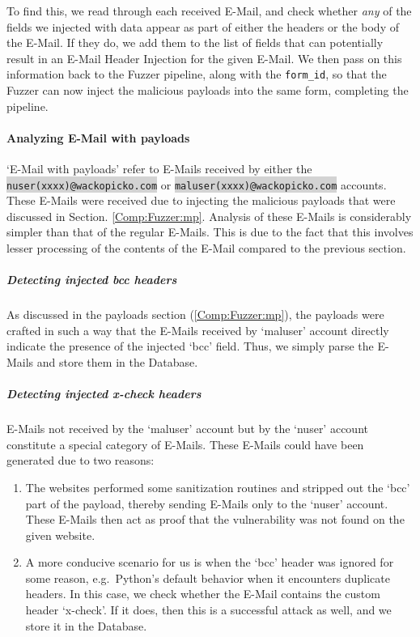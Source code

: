 To find this, we read through each received E-Mail, and check whether \emph{any} of the fields we injected with data appear as part of either the headers or the body of the E-Mail. If they do, we add them to the list of fields that can potentially result in an E-Mail Header Injection for the given E-Mail. We then pass on this information back to the Fuzzer pipeline, along with the \lstinline{form_id}, so that the Fuzzer can now inject the malicious payloads into the same form, completing the pipeline.

\paragraph{Analyzing E-Mail with payloads}
`E-Mail with payloads' refer to E-Mails received by either the \colorbox{lightgray}{\lstinline{nuser(xxxx)@wackopicko.com}} or \colorbox{lightgray}{\lstinline{maluser(xxxx)@wackopicko.com}} accounts. These E-Mails were received due to injecting the malicious payloads that were discussed in Section. \ref{Comp:Fuzzer:mp}. Analysis of these E-Mails is considerably simpler than that of the regular E-Mails. This is due to the fact that this involves lesser processing of the contents of the E-Mail compared to the previous section.
\subparagraph{Detecting injected bcc headers}
As discussed in the payloads section (\ref{Comp:Fuzzer:mp}), the payloads were crafted in such a way that the E-Mails received by `maluser' account directly indicate the presence of the injected `bcc' field. Thus, we simply parse the E-Mails and store them in the Database.

\subparagraph{Detecting injected x-check headers}
E-Mails not received by the `maluser' account but by the `nuser' account constitute a special category of E-Mails.
These E-Mails could have been generated due to two reasons:
\begin{enumerate}
	\item The websites performed some sanitization routines and stripped out the `bcc' part of the payload, thereby sending E-Mails only to the `nuser' account. These E-Mails then act as proof that the vulnerability was not found on the given website.
	\item A more conducive scenario for us is when the `bcc' header was ignored for some reason, e.g.\ Python's default behavior when it encounters duplicate headers. In this case, we check whether the E-Mail contains the custom header `x-check'. If it does, then this is a successful attack as well, and we store it in the Database.
\end{enumerate}
